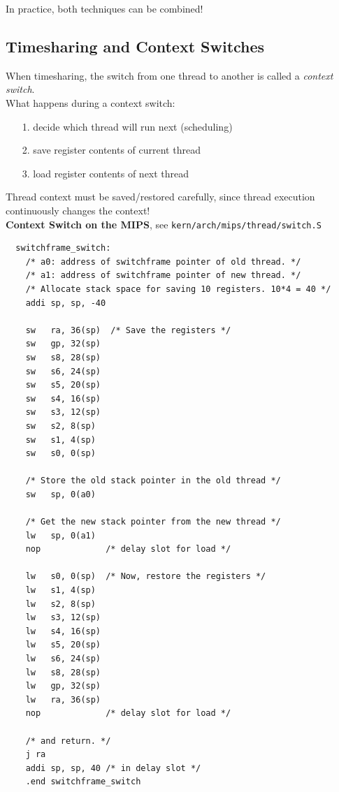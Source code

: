 \documentclass[12pt]{article}
\theoremstyle{plain}
\theoremstyle{definition}
\begin{document}
In practice, both techniques can be combined!

\subsection{Timesharing and Context Switches}
When timesharing, the switch from one thread to another is called a \emph{context switch}. \\

What happens during a context switch:
\begin{enumerate}
  \item[1.] decide which thread will run next (scheduling)
  \item[2.] save register contents of current thread
  \item[3.] load register contents of next thread
\end{enumerate}

Thread context must be saved/restored carefully, since thread execution continuously changes the context! \\

\textbf{Context Switch on the MIPS}, see \texttt{kern/arch/mips/thread/switch.S}
\begin{verbatim}
  switchframe_switch:
    /* a0: address of switchframe pointer of old thread. */
    /* a1: address of switchframe pointer of new thread. */
    /* Allocate stack space for saving 10 registers. 10*4 = 40 */
    addi sp, sp, -40

    sw   ra, 36(sp)  /* Save the registers */
    sw   gp, 32(sp)
    sw   s8, 28(sp)
    sw   s6, 24(sp)
    sw   s5, 20(sp)
    sw   s4, 16(sp)
    sw   s3, 12(sp)
    sw   s2, 8(sp)
    sw   s1, 4(sp)
    sw   s0, 0(sp)

    /* Store the old stack pointer in the old thread */
    sw   sp, 0(a0)

    /* Get the new stack pointer from the new thread */
    lw   sp, 0(a1)
    nop             /* delay slot for load */

    lw   s0, 0(sp)  /* Now, restore the registers */
    lw   s1, 4(sp)
    lw   s2, 8(sp)
    lw   s3, 12(sp)
    lw   s4, 16(sp)
    lw   s5, 20(sp)
    lw   s6, 24(sp)
    lw   s8, 28(sp)
    lw   gp, 32(sp)
    lw   ra, 36(sp)
    nop             /* delay slot for load */

    /* and return. */
    j ra
    addi sp, sp, 40 /* in delay slot */
    .end switchframe_switch
\end{verbatim}
\end{document}

